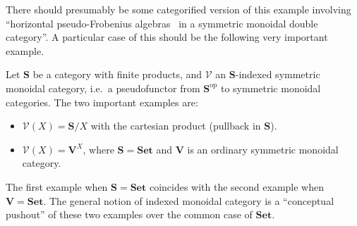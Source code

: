 \documentclass{article}
\theoremstyle{definition}
\theoremstyle{remark}
\def\V{\mathscr{V}}
\def\Set{\mathbf{Set}}
\def\op{^{\mathrm{op}}}
\def\bS{\ensuremath{\mathbf{S}}\xspace}
\begin{document}
There should presumably be some categorified version of this example involving ``horizontal pseudo-Frobenius algebras~\cite{lauda:psfrob} in a symmetric monoidal double category''.
A particular case of this should be the following very important example.

Let \bS be a category with finite products, and $\V$ an \bS-indexed symmetric monoidal category, i.e.\ a pseudofunctor from $\bS\op$ to symmetric monoidal categories.
The two important examples are:
\begin{itemize}
\item $\V(X) = \bS/X$ with the cartesian product (pullback in \bS).
\item $\V(X) = \mathbf{V}^X$, where $\bS=\Set$ and $\mathbf{V}$ is an ordinary symmetric monoidal category.
\end{itemize}
The first example when $\bS=\Set$ coincides with the second example when $\mathbf{V}=\Set$.
The general notion of indexed monoidal category is a ``conceptual pushout'' of these two examples over the common case of $\Set$.
\end{document}
